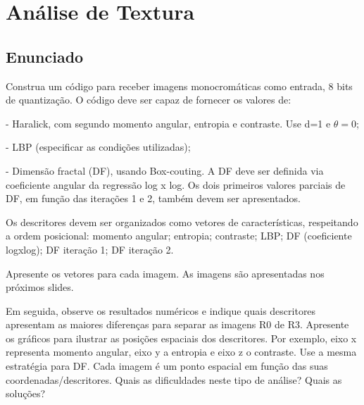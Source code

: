 \documentclass[10pt,a4paper]{article}
\begin{document}
\pagebreak

\section{Análise de Textura}

\subsection{Enunciado}

\begin{flushleft}
Construa um código para receber imagens monocromáticas como entrada, 8 bits de quantização. O código deve ser capaz de fornecer os valores de:
\end{flushleft}

\begin{flushleft}
- Haralick, com segundo momento angular, entropia e contraste. Use d=1 e $\theta=0$;
\end{flushleft}

\begin{flushleft}
- LBP (especificar as condições utilizadas);
\end{flushleft}

\begin{flushleft}
- Dimensão fractal (DF), usando Box-couting. A DF deve ser definida via coeficiente angular da regressão log x log. Os dois primeiros valores parciais de DF, em função das iterações 1 e 2, também devem ser apresentados.
\end{flushleft}

\begin{flushleft}
Os descritores devem ser organizados como vetores de características, respeitando a ordem posicional: momento angular; entropia; contraste; LBP; DF (coeficiente logxlog); DF iteração 1; DF iteração 2.
\end{flushleft}

\begin{flushleft}
Apresente os vetores para cada imagem. As imagens são apresentadas nos próximos slides.
\end{flushleft}

\begin{flushleft}
Em seguida, observe os resultados numéricos e indique quais descritores apresentam as maiores diferenças para separar as imagens R0 de R3. Apresente os gráficos para ilustrar as posições espaciais dos descritores. Por exemplo, eixo x representa momento angular, eixo y a entropia e eixo z o contraste. Use a mesma estratégia para DF. Cada imagem é um ponto espacial em função das suas coordenadas/descritores. Quais as dificuldades neste tipo de análise? Quais as soluções?
\end{flushleft}
\end{document}

